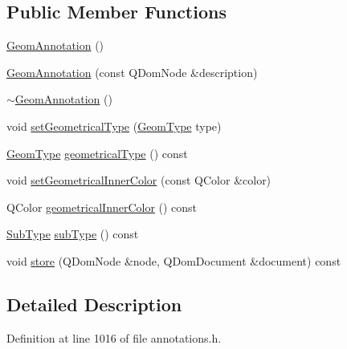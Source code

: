 \subsection*{Public Member Functions}
\begin{DoxyCompactItemize}
\item 
\hyperlink{classOkular_1_1GeomAnnotation_ad4196689e1558a32038c2f456f289d2c}{Geom\+Annotation} ()
\item 
\hyperlink{classOkular_1_1GeomAnnotation_afd5eb7d7b4ab4431e2333d3926fb2ebc}{Geom\+Annotation} (const Q\+Dom\+Node \&description)
\item 
\hyperlink{classOkular_1_1GeomAnnotation_a07db587866832993f8a3735f5e302b96}{$\sim$\+Geom\+Annotation} ()
\item 
void \hyperlink{classOkular_1_1GeomAnnotation_a5e9487a727fc9299b69db657bb69fd89}{set\+Geometrical\+Type} (\hyperlink{classOkular_1_1GeomAnnotation_a511623ed10a8d1f18cfd5987fadee682}{Geom\+Type} type)
\item 
\hyperlink{classOkular_1_1GeomAnnotation_a511623ed10a8d1f18cfd5987fadee682}{Geom\+Type} \hyperlink{classOkular_1_1GeomAnnotation_adeae1cc4b72aed7e9705b51f91f8555f}{geometrical\+Type} () const 
\item 
void \hyperlink{classOkular_1_1GeomAnnotation_ab47f1690d00f9ee6efc70c19aeb2e7e8}{set\+Geometrical\+Inner\+Color} (const Q\+Color \&color)
\item 
Q\+Color \hyperlink{classOkular_1_1GeomAnnotation_a5c84e1cbdf0d2bb6b75b6d6b049af63b}{geometrical\+Inner\+Color} () const 
\item 
\hyperlink{classOkular_1_1Annotation_af71b46e37d5f850b97d5c4de3be9aac0}{Sub\+Type} \hyperlink{classOkular_1_1GeomAnnotation_abbe9f72f1ec6c537ef5de2faae459d81}{sub\+Type} () const 
\item 
void \hyperlink{classOkular_1_1GeomAnnotation_abf08da23de3fe161e9fdb9ac702532d9}{store} (Q\+Dom\+Node \&node, Q\+Dom\+Document \&document) const 
\end{DoxyCompactItemize}


\subsection{Detailed Description}


Definition at line 1016 of file annotations.\+h.



